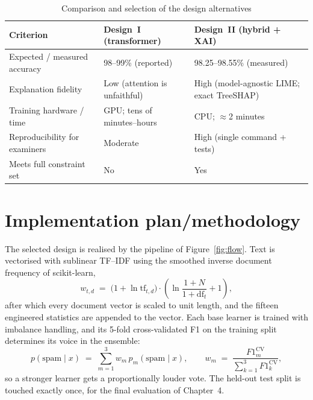 \documentclass[12pt,a4paper]{report}
\begin{document}
\begin{table}[H]
  \centering
  \caption{Comparison and selection of the design alternatives}
  \label{tab:designsel}
  \begin{tabular}{|L{4.4cm}|L{4.3cm}|L{4.6cm}|}
    \hline
    \textbf{Criterion} & \textbf{Design~I (transformer)} & \textbf{Design~II (hybrid + XAI)} \\
    \hline
    Expected / measured accuracy & 98--99\% (reported) & 98.25--98.55\% (measured) \\
    \hline
    Explanation fidelity & Low (attention is unfaithful) & High (model-agnostic LIME; exact TreeSHAP) \\
    \hline
    Training hardware / time & GPU; tens of minutes--hours & CPU; $\approx$2 minutes \\
    \hline
    Reproducibility for examiners & Moderate & High (single command + tests) \\
    \hline
    Meets full constraint set & No & Yes \\
    \hline
  \end{tabular}
\end{table}

\section{Implementation plan/methodology}

The selected design is realised by the pipeline of Figure~\ref{fig:flow}.
Text is vectorised with sublinear TF--IDF using the smoothed inverse document
frequency of scikit-learn,
\begin{equation}
  w_{t,d} \;=\; \bigl(1+\ln \mathrm{tf}_{t,d}\bigr)\cdot
                \left(\ln\frac{1+N}{1+\mathrm{df}_t}+1\right),
  \label{eq:tfidf}
\end{equation}
after which every document vector is scaled to unit length, and the fifteen
engineered statistics are appended to the vector. Each base
learner is trained with imbalance handling, and its 5-fold cross-validated F1
on the training split determines its voice in the ensemble:
\begin{equation}
  p(\mathrm{spam}\mid x) \;=\; \sum_{m=1}^{3} w_m\, p_m(\mathrm{spam}\mid x),
  \qquad
  w_m \;=\; \frac{F1^{\mathrm{CV}}_m}{\sum_{k=1}^{3} F1^{\mathrm{CV}}_k},
  \label{eq:ensemble}
\end{equation}
so a stronger learner gets a proportionally louder vote. The held-out test
split is touched exactly once, for the final evaluation of Chapter~4.
\end{document}
